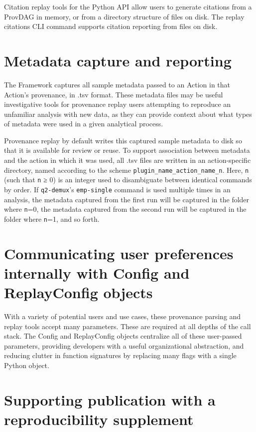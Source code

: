 Citation replay tools for the Python API allow users to generate citations from
a ProvDAG in memory, or from a directory structure of files on disk. The replay
citations CLI command supports citation reporting from files on disk.


\section{Metadata capture and reporting}

The Framework captures all sample metadata passed to an Action in that Action’s
provenance, in .tsv format. These metadata files may be useful investigative
tools for provenance replay users attempting to reproduce an unfamiliar analysis
with new data, as they can provide context about what types of metadata were
used in a given analytical process.

Provenance replay by default writes this captured sample metadata to disk so
that it is available for review or reuse. To support association between
metadata and the action in which it was used, all .tsv files are written in an
action-specific directory, named according to the scheme
\texttt{plugin\_name\_action\_name\_n}. Here, \texttt{n} (such that \texttt{n} ≥ 0) is an integer used to
disambiguate between identical commands by order. If \texttt{q2-demux}’s \texttt{emp-single}
command is used multiple times in an analysis, the metadata captured from the first
run will be captured in the folder where \texttt{n}=0, the metadata captured from the second
run will be captured in the folder where \texttt{n}=1, and so forth.


\section{Communicating user preferences internally with Config and ReplayConfig objects}

With a variety of potential users and use cases, these provenance parsing and
replay tools accept many parameters. These are required at all depths of the
call stack. The Config and ReplayConfig objects centralize all of these
user-passed parameters, providing developers with a useful organizational
abstraction, and reducing clutter in function signatures by replacing many flags
with a single Python object. 


\section{Supporting publication with a reproducibility supplement}

